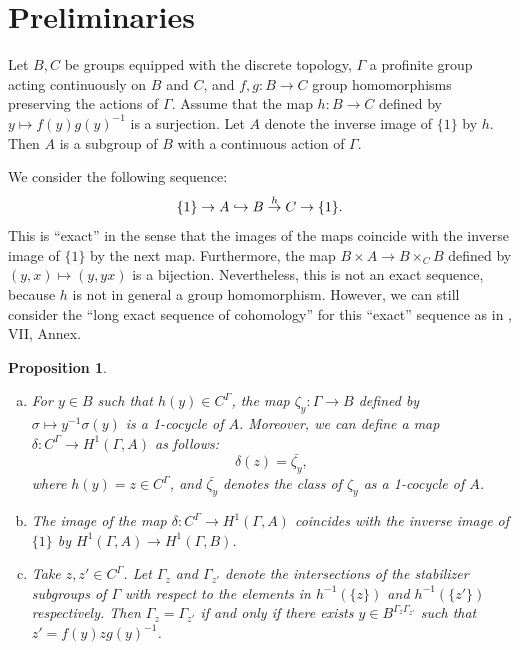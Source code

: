 \documentclass[sn-mathphys-num]{sn-jnl}
\numberwithin{equation}{section}
\theoremstyle{plain}
\newtheorem{prop}[theo]{Proposition}
\theoremstyle{definition}
\begin{document}
\section{Preliminaries}\label{sa}

Let $B,C$ be groups equipped with the discrete topology, $\Gamma$ a profinite group acting continuously on $B$ and $C$, and $f,g:B\to C$ group homomorphisms preserving the actions of $\Gamma$. Assume that the map $h:B\to C$ defined by $y\mapsto f(y)g(y)^{-1}$ is a surjection. Let $A$ denote the inverse image of $\{1\}$ by $h$. Then $A$ is a subgroup of $B$ with a continuous action of $\Gamma$.

We consider the following sequence:
\begin{equation}
\{1\}\to A\hookrightarrow B\overset{h}{\to} C\to\{1\}.\\
\end{equation}
This is ``exact'' in the sense that the images of the maps coincide with the inverse image of $\{1\}$ by the next map. Furthermore, the map $B\times A\to B\times_CB$ defined by $(y,x)\mapsto (y,yx)$ is a bijection. Nevertheless, this is not an exact sequence, because $h$ is not in general a group homomorphism. However, we can still consider the ``long exact sequence of cohomology'' for this ``exact'' sequence as in \cite{Se}, VII, Annex.\\

\begin{prop}\label{lk}
  \begin{enumerate}[(a)]
    \item\label{lk-1} For $y\in B$ such that $h(y)\in C^\Gamma$, the map $\zeta_y:\Gamma\to B$ defined by $\sigma\mapsto y^{-1}\sigma(y)$ is a 1-cocycle of $A$. Moreover, we can define a map $\delta:C^\Gamma\to H^1(\Gamma,A)$ as follows:
  \begin{equation}
\delta(z)=\bar{\zeta_y},
\end{equation}
where $h(y)=z\in C^\Gamma$, and $\bar{\zeta_y}$ denotes the class of $\zeta_y$ as a 1-cocycle of $A$.
\item\label{lk-3} The image of the map $\delta:C^\Gamma\to H^1(\Gamma,A)$ coincides with the inverse image of $\{1\}$ by $H^1(\Gamma,A)\to H^1(\Gamma,B)$.
\item\label{lk-4} Take $z,z'\in C^\Gamma$. Let $\Gamma_z$ and $\Gamma_{z'}$ denote the intersections of the stabilizer subgroups of $\Gamma$ with respect to the elements in $h^{-1}(\{z\})$ and $h^{-1}(\{z'\})$ respectively. Then $\Gamma_z=\Gamma_{z'}$ if and only if there exists $y\in B^{\Gamma_z\Gamma_{z'}}$ such that $z'=f(y)zg(y)^{-1}$.
\end{enumerate}
\end{prop}
\end{document}
